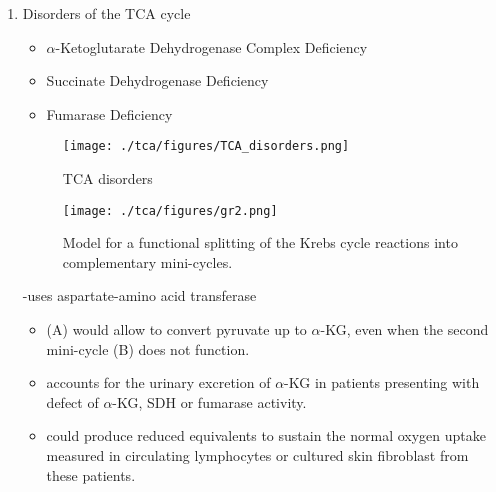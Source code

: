 \documentclass{scrartcl}
\begin{document}
\begin{enumerate}
\item Disorders of the TCA cycle
\label{sec:orgd27e540}

\begin{itemize}
\item \(\alpha\)-Ketoglutarate Dehydrogenase Complex Deficiency
\item Succinate Dehydrogenase Deficiency
\item Fumarase Deficiency
\end{itemize}

\begin{figure}[htbp]
\centering
\texttt{[image: ./tca/figures/TCA\_disorders.png]}
\caption{\label{fig:org61b15bc}
TCA disorders}
\end{figure}


\begin{figure}[htbp]
\centering
\texttt{[image: ./tca/figures/gr2.png]}
\caption{\label{fig:org115887b}
Model for a functional splitting of the Krebs cycle reactions into complementary mini-cycles.}
\end{figure}

-uses aspartate-amino acid transferase
\begin{itemize}
\item (A) would allow to convert pyruvate up to \(\alpha\)-KG, even when the second mini-cycle (B) does not function.
\item accounts for the urinary excretion of \(\alpha\)-KG in patients
presenting with defect of \(\alpha\)-KG, SDH or fumarase activity.
\item could produce reduced equivalents to sustain the normal oxygen
uptake measured in circulating lymphocytes or cultured skin
fibroblast from these patients.
\end{itemize}
\end{enumerate}
\end{document}
